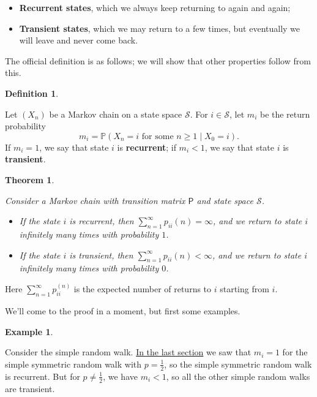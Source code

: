 \documentclass[
  a4paper,
]{article}
\providecommand{\tightlist}{%
  \setlength{\itemsep}{0pt}\setlength{\parskip}{0pt}}
\newtheorem{theorem}{Theorem}[section]
\theoremstyle{definition}
\newtheorem{definition}{Definition}[section]
\theoremstyle{definition}
\newtheorem{example}{Example}[section]
\theoremstyle{definition}
\theoremstyle{remark}
\begin{document}
\begin{itemize}
\tightlist
\item
  \textbf{Recurrent states}, which we always keep returning to again and again;
\item
  \textbf{Transient states}, which we may return to a few times, but eventually we will leave and never come back.
\end{itemize}

The official definition is as follows; we will show that other properties follow from this.

\begin{definition}
\protect\hypertarget{def:unlabeled-div-3}{}\label{def:unlabeled-div-3}

Let \((X_n)\) be a Markov chain on a state space \(\mathcal S\). For \(i \in \mathcal S\), let \(m_i\) be the return probability
\[ m_i = \mathbb P(X_n = i \text{ for some $n \geq 1$} \mid X_0 = i) . \]
If \(m_i = 1\), we say that state \(i\) is \textbf{recurrent}; if \(m_i < 1\), we say that state \(i\) is \textbf{transient}.

\end{definition}

\begin{theorem}
\protect\hypertarget{thm:rectran}{}\label{thm:rectran}

Consider a Markov chain with transition matrix \(\mathsf P\) and state space \(\mathcal S\).

\begin{itemize}
\tightlist
\item
  If the state \(i\) is recurrent, then \(\sum_{n=1}^\infty p_{ii}(n) = \infty\), and we return to state \(i\) infinitely many times with probability \(1\).
\item
  If the state \(i\) is transient, then \(\sum_{n=1}^\infty p_{ii}(n) < \infty\), and we return to state \(i\) infinitely many times with probability \(0\).
\end{itemize}

\end{theorem}

Here \(\sum_{n=1}^\infty p_{ii}^{(n)}\) is the expected number of returns to \(i\) starting from \(i\).

We'll come to the proof in a moment, but first some examples.

\begin{example}
\protect\hypertarget{exm:rw-rec-trans}{}\label{exm:rw-rec-trans}

Consider the simple random walk. \protect\hyperlink{S08-return-rw}{In the last section} we saw that \(m_i = 1\) for the simple symmetric random walk with \(p = \frac12\), so the simple symmetric random walk is recurrent. But for \(p \neq \frac12\), we have \(m_i < 1\), so all the other simple random walks are transient.

\end{example}
\end{document}

